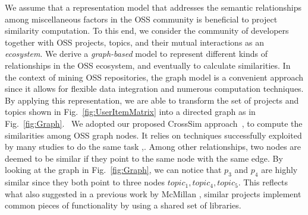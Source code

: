 

We assume that a representation model that addresses the semantic 
relationships among miscellaneous factors in the OSS community is beneficial to 
project similarity computation. To this end, we consider the community of developers together with 
OSS projects, topics, and their mutual interactions as an 
\textit{ecosystem}. We derive a 
\textit{graph-based} model to represent different kinds of relationships in the OSS ecosystem, and 
eventually to calculate similarities. In the context of mining OSS repositories, the graph model is a convenient approach since it allows for flexible data integration and numerous computation techniques. 
By applying this representation, we are able to transform the set of projects and topics shown in Fig.~\ref{fig:UserItemMatrix} into a directed graph as in Fig.~\ref{fig:Graph}.
~We adopted our proposed CrossSim approach~\cite{Nguyen:2019:FRS:3339505.3339636},\cite{8498236} to compute the 
similarities among OSS graph nodes. It relies on techniques successfully 
exploited by many studies to do the same task 
\cite{DiNoia:2012:LOD:2362499.2362501},\cite{BRIGUEZ20146467}. Among 
other relationships, two nodes are deemed to be similar if they point to the same node with the same edge. By looking at the graph in 
Fig.~\ref{fig:Graph}, we can notice that $p_3$ and $p_4$ are highly 
similar since they both point to three nodes $topic_{1}, topic_{4}, topic_{5}$.  This 
reflects what also suggested in a previous work by McMillan \etal 
\cite{McMillan:2012:DSS:2337223.2337267}, \ie similar projects implement common 
pieces of functionality by using a shared set of libraries.


